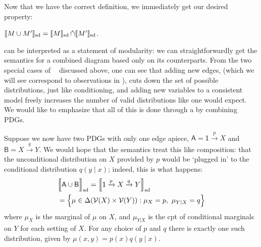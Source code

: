 \documentclass{article}
\DeclarePairedDelimiter{\SD}{\llbracket}{\rrbracket_{\text{sd}}}
\DeclareMathOperator\dcap{\mathop{\dot\cap}}
\newcommand{\V}{\mathcal V}
\newcommand{\MN}{PDG}
\newcommand{\MNs}{\MN s}
\numberwithin{equation}{section}
\begin{document}
	
	Now that we have the correct definition, we immediately get our desired property:
	
	\begin{prop}\label{prop:union-set-semantics}
		$\SD{M \cup M'} = \SD{M} \dcap \SD{M'}$.
	\end{prop}

	 can be interpreted as a statement of modularity: we can straightforwardly get the semantics for a combined diagram based only on its counterparts. 
	From the two special cases of $\dcap$ discussed above, one can see that adding new edges, (which we will see correspond to observations in ), cuts down the set of possible distributions, just like conditioning, and adding new variables to a consistent model freely increases the number of valid distributions like one would expect. We would like to emphasize that all of this is done through a by combining \MNs.
	
	\begin{example}\label{ex:sd-compose-unconditional}
		Suppose we now have two PDGs with only one edge apiece, $\mathsf A = {\mathsf 1} \xrightarrow{p} X$ and $\mathsf B = X \xrightarrow{q} Y$. We would hope that the semantics treat this like composition: that the unconditional distribution on $X$ provided by $p$ would be `plugged in' to the conditional distribution $q(y \mid x)$; indeed, this is what happens:
		\begin{align*}
			&\SD[\Big]{{\sf A \cup B}} = \SD[\Big]{{\mathsf 1} \xrightarrow{p} X \xrightarrow{q} Y} \\
				&= \Big\{  \mu \in \Delta(\V(X) \times \V(Y)) : \mu_X = p,~\mu_{Y|X} = q \Big\} 
		\end{align*}
		where $\mu_X$ is the marginal of $\mu$ on $X$, and $\mu_{Y|X}$ is the cpt of conditional marginals on $Y$ for each setting of $X$.
		For any choice of $p$ and $q$ there is exactly one such distribution, given by $\mu(x,y) = p(x) q(y \mid x)$.
	\end{example}
\end{document}
